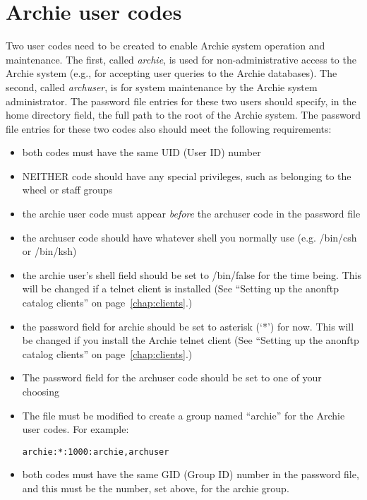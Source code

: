 %
%

\section{Archie user codes}


Two user codes need to be created to enable Archie system operation and
maintenance. The first, called {\it archie}, is used for non-administrative
access to the Archie system (e.g., for accepting user queries to the Archie
databases). The second, called {\it archuser}, is for system maintenance by
the Archie system administrator. The password file entries for these two users
should specify, in the home directory field, the full path to the root of the
Archie system. The password file entries for these two codes also should meet
the following requirements:


\begin{itemize}

\item
both codes must have the same UID (User ID) number

\item
NEITHER code should have any special privileges, such as belonging to the
wheel or staff groups

\item
the archie user code must appear {\it before} the archuser code in the password
file

\item
the archuser code should have whatever shell you normally use (e.g.
/bin/csh or /bin/ksh)

\item
the archie user's shell field should be set to /bin/false for the time
being. This will be changed if a telnet client is installed
(See ``Setting up the anonftp catalog clients'' on page~\ref{chap:clients}.)

\item
the password field for archie should be set to asterisk (`*') for now. This
will be changed if you install the Archie telnet client
(See ``Setting up the anonftp catalog clients'' on page~\ref{chap:clients}.)

\item
The password field for the archuser code should be set to one of your choosing

\item
The  file must be modified to create a group named ``archie''
for the Archie user codes. For example:

\texttt{archie:*:1000:archie,archuser}

\item both codes must have the same GID (Group ID) number in the password
file, and this must be the number, set above, for the archie group.

\end{itemize}

